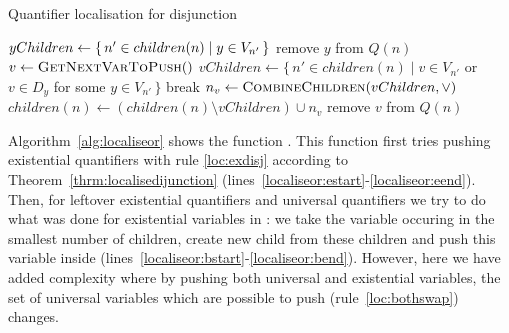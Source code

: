 \documentclass[
  digital, %
  color,
  twoside, %
  table,   %
  nolof,     %
  nolot,     %
]{fithesis3}
\let\setbuilder\set
\newcommand{\simpleset}[1]{\{{#1}\}}
\renewcommand{\set}[1]{\normalexpandarg\IfSubStr{#1}{|}{\setbuilder{#1}}{\simpleset{#1}}}
\theoremstyle{definition}
\theoremstyle{remark}
\newcommand{\vars}[1]{V_{#1}}
\newcommand{\prefix}[1]{Q({#1})}
\newcommand{\eprefix}[1]{Q_{\exists}(#1)}
\newcommand{\children}[1]{children({#1})}
\begin{document}
\begin{algorithm}[t]
  \caption{Quantifier localisation for disjunction}
  \label{alg:localiseor}
  \begin{algorithmic}[1]
      \ForAll{$y \in \eprefix{n}$}\label{localiseor:estart}
        \State $yChildren \gets \set{n' \in \children{n} | y \in \vars{n'}}$\label{localiseor:egetchildren}
            \State {}\label{localiseor:epush}
          \EndFor
          \State remove $y$ from $\prefix{n}$
        \EndIf
      \EndFor\label{localiseor:eend}
      \While{$\prefix{n} \not= \emptyset$}\label{localiseor:bstart}
        \State $v \gets \Call{GetNextVarToPush}{\null}$\label{localiseor:getnextvar}
        \State $vChildren \gets \{\,n' \in \children{n} \mid v \in \vars{n'}$  or  $v \in D_y$ for\label{localiseor:bgetchildren}
        \Statex \hspace{9cm} some $y \in \vars{n'}\,\}$
        \If{$vChildren = \children{n}$}\label{localiseor:bcompare}
          \State break
        \Else
          \State $n_v \gets \Call{CombineChildren}{vChildren, {\lor}}$\label{localiseor:bcombine}
          \State $\children{n} \gets (\children{n} \setminus vChildren) \cup n_v$\label{localiseor:bupdatechildren}
          \State {}\label{localiseor:bpush}
          \State remove $v$ from $\prefix{n}$\label{localiseor:bremove}
        \EndIf
      \EndWhile\label{localiseor:bend}
    \EndFunction
  \end{algorithmic}
\end{algorithm}

Algorithm~\ref{alg:localiseor} shows the function . This function first tries pushing existential quantifiers with rule \eqref{loc:exdisj} according to Theorem~\ref{thrm:localisedijunction} (lines~\ref{localiseor:estart}-\ref{localiseor:eend}). Then, for leftover existential quantifiers and universal quantifiers we try to do what was done for existential variables in : we take the variable occuring in the smallest number of children, create new child from these children and push this variable inside (lines~\ref{localiseor:bstart}-\ref{localiseor:bend}). However, here we have added complexity where by pushing both universal and existential variables, the set of universal variables which are possible to push (rule~\eqref{loc:bothswap}) changes.
\end{document}

